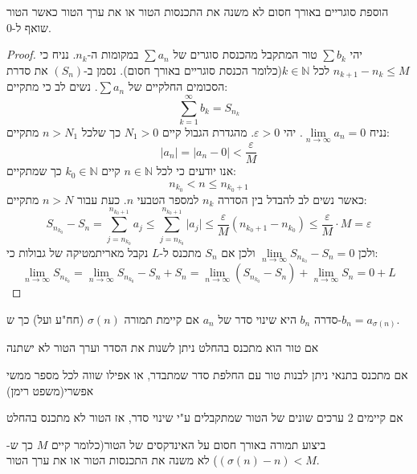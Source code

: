 \documentclass{tstextbook}
\begin{document}
\begin{proposition}
הוספת סוגריים באורך חסום לא משנה את התכנסות הטור או את ערך הטור כאשר הטור שואף ל-0.

\end{proposition}
\begin{proof}
יהי \(\sum b_{k}\) טור המתקבל מהכנסת סוגרים של \(\sum a_{n}\) במקומות ה-\(n_{k}\). נניח כי \(n_{k+1}-n_{k}\leq M\) לכל \(k \in \mathbb{N}\)(כלומר הכנסת סוגריים באורך חסום). נסמן ב-\((S_{n})\) את סדרת הסכומים החלקיים של \(\sum a_{n}\). נשים לב כי מתקיים:
$$\sum_{k=1}^{\infty}b_{k}=S_{n_{k}} $$
נניח \(\underset{ n \to \infty }{\lim }a_{n}=0\). יהי \(\varepsilon > 0\).  מהגדרת הגבול קיים \(N_{1}> 0\) כך שלכל \(n>N_{1}\) מתקיים:
$$\lvert a_{n} \rvert =\lvert a_{n}-0 \rvert < \frac{\varepsilon}{M}$$
אנו יודעים כי לכל \(n \in \mathbb{N}\) קיים \(k_{0} \in \mathbb{N}\) כך שמתקיים:
$$n_{k_{0}}<n\leq n_{k_{0}+1}$$
כאשר נשים לב להבדל בין הסדרה \(n_{k}\) למספר הטבעי \(n\). כעת עבור \(n>N\) מתקיים:
$$S_{n_{k_{0}}}-S_{n}=\sum_{j=n_{k_{0}}}^{n_{k_{0}+1}}a_{j}\leq \sum_{j=n_{k_{0}}}^{n_{k_{0}+1}}\lvert a_{j} \rvert \leq \frac{\varepsilon}{M}(n_{k_{0}+1}-n_{k_{0}})\leq \frac{\varepsilon}{M}\cdot M=\varepsilon $$
ולכן \(\underset{ n \to \infty }{\lim }S_{n_{k_{0}}}-S_{n}=0\) ולכן אם \(S_{n}\) מתכנס ל-\(L\) נקבל מאריתמטיקה של גבולות כי:
$$\lim_{ n \to \infty } S_{n_{k_{0}}}=\lim_{ n \to \infty } S_{n_{k_{0}}}-S_{n}+S_{n}=\lim_{ n \to \infty } (S_{n_{k_{0}}}-S_{n})+\lim_{ n \to \infty } S_{n}=0+L$$

\end{proof}
\begin{definition}
סדרה \(b_n\) היא שינוי סדר של \(a_n\) אם קיימת תמורה \(\sigma(n)\) (חח"ע ועל) כך ש-\(b_n = a_{\sigma(n)}\).

\end{definition}
\begin{proposition}
אם טור הוא מתכנס בהחלט ניתן לשנות את הסדר וערך הטור לא ישתנה

\end{proposition}
\begin{theorem}
אם מתכנס בתנאי ניתן לבנות טור עם החלפת סדר שמתבדר, או אפילו שווה לכל מספר ממשי אפשרי(משפט רימן)

\end{theorem}
\begin{proposition}
אם קיימים 2 ערכים שונים של הטור שמתקבלים ע"י שינוי סדר, אז הטור לא מתכנס בהחלט

\end{proposition}
\begin{proposition}
ביצוע תמורה באורך חסום על האינדקסים של הטור(כלומר קיים \(M\) כך ש-\((\sigma(n) - n)<M\)) לא משנה את התכנסות הטור או את ערך הטור.

\end{proposition}
\end{document}
